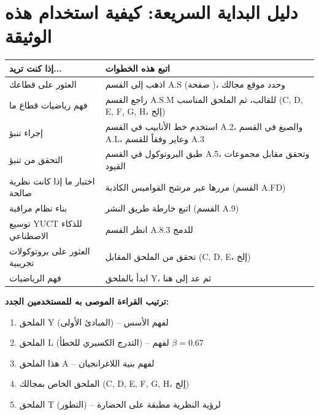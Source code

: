 \documentclass[13pt,a4paper]{article}
\begin{document}
	\section*{دليل البداية السريعة: كيفية استخدام هذه الوثيقة}
	
	\begin{tabularx}{\textwidth}{|p{3.5cm}|X|}
		\hline
		\textbf{إذا كنت تريد...} & \textbf{اتبع هذه الخطوات} \\
		\hline
		العثور على قطاعك & اذهب إلى القسم A.S (صفحة \pageref{sec:sector-catalog})، وحدد موقع مجالك \\
		\hline
		فهم رياضيات قطاع ما & راجع القسم A.S.M للقالب، ثم الملحق المناسب (C, D, E, F, G, H، إلخ) \\
		\hline
		إجراء تنبؤ & استخدم خط الأنابيب في القسم A.2، والصيغ في القسم A.L، وعاير وفقاً للقسم A.3 \\
		\hline
		التحقق من تنبؤ & طبق البروتوكول في القسم A.5، وتحقق مقابل مجموعات القيود \\
		\hline
		اختبار ما إذا كانت نظرية صالحة & مررها عبر مرشح القواميس الكاذبة (القسم A.FD) \\
		\hline
		بناء نظام مراقبة & اتبع خارطة طريق النشر (القسم A.9) \\
		\hline
		توسيع YUCT للذكاء الاصطناعي & انظر القسم A.8.3 للدمج \\
		\hline
		العثور على بروتوكولات تجريبية & تحقق من الملحق المقابل (C, D, E، إلخ) \\
		\hline
		فهم الرياضيات & ابدأ بالملحق Y، ثم عد إلى هنا \\
		\hline
	\end{tabularx}
	
	\vspace{0.5cm}
	\noindent\textbf{ترتيب القراءة الموصى به للمستخدمين الجدد:}
	\begin{enumerate}
		\item الملحق Y (المبادئ الأولى) – لفهم الأسس
		\item الملحق L (التدرج الكسيري للخطأ) – لفهم $\beta = 0.67$
		\item هذا الملحق A – لفهم بنية اللاغرانجيان
		\item الملحق الخاص بمجالك (C, D, E, F, G, H، إلخ)
		\item الملحق T (التطور) – لرؤية النظرية مطبقة على الحضارة
	\end{enumerate}
	
\end{document}

